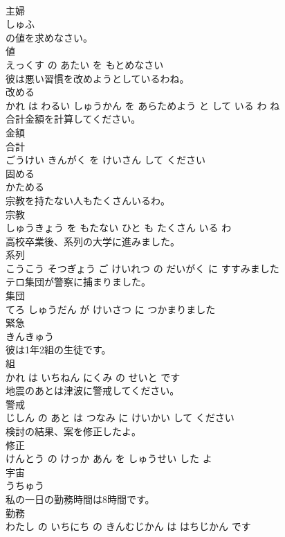 \documentclass[8pt]{extreport}
\begin{document}
\begin{CJK}{UTF8}{min}
\\	主婦	
\\	しゅふ		
\\	の値を求めなさい。	
\\	値 
\\	えっくす の あたい を もとめなさい		
\\	彼は悪い習慣を改めようとしているわね。	
\\	改める 
\\	かれ は わるい しゅうかん を あらためよう と して いる わ ね		
\\	合計金額を計算してください。	
\\	金額 
\\	合計 
\\	ごうけい きんがく を けいさん して ください		
\\	固める	
\\	かためる		
\\	宗教を持たない人もたくさんいるわ。	
\\	宗教 
\\	しゅうきょう を もたない ひと も たくさん いる わ		
\\	高校卒業後、系列の大学に進みました。	
\\	系列 
\\	こうこう そつぎょう ご けいれつ の だいがく に すすみました		
\\	テロ集団が警察に捕まりました。	
\\	集団 
\\	てろ しゅうだん が けいさつ に つかまりました		
\\	緊急	
\\	きんきゅう		
\\	彼は1年2組の生徒です。	
\\	組 
\\	かれ は いちねん にくみ の せいと です		
\\	地震のあとは津波に警戒してください。	
\\	警戒 
\\	じしん の あと は つなみ に けいかい して ください		
\\	検討の結果、案を修正したよ。	
\\	修正 
\\	けんとう の けっか あん を しゅうせい した よ		
\\	宇宙	
\\	うちゅう		
\\	私の一日の勤務時間は8時間です。	
\\	勤務 
\\	わたし の いちにち の きんむじかん は はちじかん です		

\end{CJK}
\end{document}

